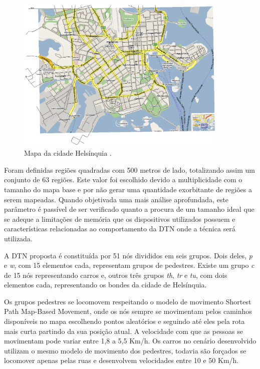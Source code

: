 \begin{figure}[htp!]
\centering
\includegraphics[width=0.9\textwidth]{figuras/cap_5/mapa_helsinquia.png}
\caption{Mapa da cidade Helsínquia \cite{keranen2009one}.}
\label{mapa_helsinquia}
\end{figure}

Foram definidas regiões quadradas com 500 metros de lado, totalizando assim um conjunto de 63 regiões. Este valor foi escolhido devido a multiplicidade com o tamanho do mapa base e por não gerar uma quantidade exorbitante de regiões a serem mapeadas. Quando objetivada uma mais análise aprofundada, este parâmetro é passível de ser verificado quanto a procura de um tamanho ideal que se adeque a limitações de memória que os dispositivos utilizados possuem e características relacionadas ao comportamento da DTN onde a técnica será utilizada.

A DTN proposta é constituída por 51 nós divididos em seis grupos. Dois deles, \emph{p} e \emph{w}, com 15 elementos cada, representam grupos de pedestres. Existe um grupo \emph{c} de 15 nós representando carros e, outros três grupos \emph{th}, \emph{tr} e \emph{tu}, com dois elementos cada, representando os bondes da cidade de Helsínquia. 

Os grupos pedestres se locomovem respeitando o modelo de movimento Shortest Path Map-Based Movement, onde os nós sempre se movimentam pelos caminhos disponíveis no mapa escolhendo pontos aleatórios e seguindo até eles pela rota mais curta partindo da sua posição atual. A velocidade com que as pessoas se movimentam pode variar entre 1,8 a 5,5 Km/h. Os carros no cenário desenvolvido utilizam o mesmo modelo de movimento dos pedestres, todavia são forçados se locomover apenas pelas ruas e desenvolvem velocidades entre 10 e 50 Km/h.

